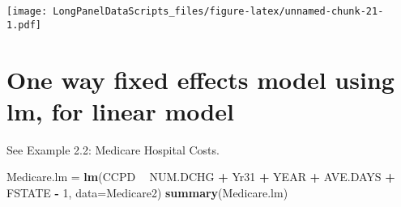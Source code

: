 \documentclass[]{book}
\newenvironment{Shaded}{\begin{snugshade}}{\end{snugshade}}
\newcommand{\DataTypeTok}[1]{\textcolor[rgb]{0.13,0.29,0.53}{#1}}
\newcommand{\DecValTok}[1]{\textcolor[rgb]{0.00,0.00,0.81}{#1}}
\newcommand{\KeywordTok}[1]{\textcolor[rgb]{0.13,0.29,0.53}{\textbf{#1}}}
\newcommand{\NormalTok}[1]{#1}
\newcommand{\OperatorTok}[1]{\textcolor[rgb]{0.81,0.36,0.00}{\textbf{#1}}}
\newcommand{\StringTok}[1]{\textcolor[rgb]{0.31,0.60,0.02}{#1}}
\begin{document}
\texttt{[image: LongPanelDataScripts\_files/figure-latex/unnamed-chunk-21-1.pdf]}

\hypertarget{one-way-fixed-effects-model-using-lm-for-linear-model}{%
\section{One way fixed effects model using lm, for linear model}\label{one-way-fixed-effects-model-using-lm-for-linear-model}}

See Example 2.2: Medicare Hospital Costs.

\begin{Shaded}
\begin{Highlighting}[]
\NormalTok{Medicare.lm =}\StringTok{ }\KeywordTok{lm}\NormalTok{(CCPD }\OperatorTok{~}\StringTok{ }\NormalTok{NUM.DCHG }\OperatorTok{+}\StringTok{ }\NormalTok{Yr31 }\OperatorTok{+}\StringTok{ }\NormalTok{YEAR }\OperatorTok{+}\StringTok{ }\NormalTok{AVE.DAYS }\OperatorTok{+}\StringTok{ }\NormalTok{FSTATE }\OperatorTok{-}\StringTok{ }\DecValTok{1}\NormalTok{, }\DataTypeTok{data=}\NormalTok{Medicare2)}
\KeywordTok{summary}\NormalTok{(Medicare.lm)}
\end{Highlighting}
\end{Shaded}
\end{document}
